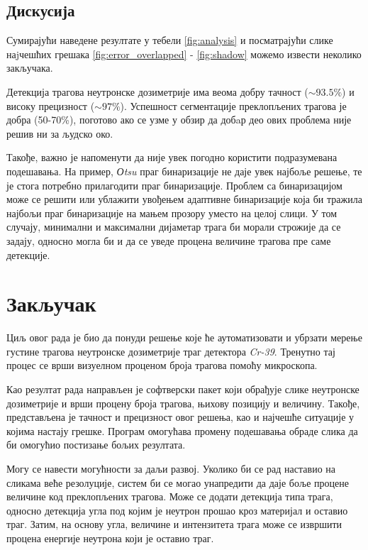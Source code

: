 \documentclass[11pt,a4paper,serbian,oneside]{book}
\begin{document}
\section{Дискусија}

Сумирајући наведене резултате у тебели \ref{fig:analysis} и посматрајући слике наjчешћих грешака  \ref{fig:error_overlapped} - \ref{fig:shadow} можемо извести неколико закључака.

Детекција трагова неутронске дозиметрије има веома добру тачност ($\sim93.5\%$) и  високу прецизност ($\sim97\%$). Успешност сегментације преклопљених трагова је добра (50-70\%), поготово ако се узме у обзир да добaр део ових проблема није решив ни за људско око.

Такође, важно је напоменути да није увек погодно користити подразумевана подешавања. На пример, \textit{Оtsu} праг бинаризације не даје увек најбоље решење, те је стога потребно прилагодити праг бинаризације. Проблем са бинаризацијом може се решити или ублажити увођењем адаптивне бинаризације која би тражила најбољи праг бинаризације на мањем прозору уместо на целој слици. У том случају, минимални и максимални дијаметар трага би морали строжије да се задају, односно могла би и да се уведе процена величине трагова пре саме детекције.

%
%
%

\chapter{Закључак}

Циљ овог рада је био да понуди решење које ће аутоматизовати и убрзати мерење густине трагова неутронске дозиметрије траг детектора \textit{Cr-39}. Тренутно тај процес се врши визуелном проценом броја трагова помоћу микроскопа.

Као резултат рада направљен је софтверски пакет који обрађује слике неутронске дозиметрије и врши процену броја трагова, њихову позицију и величину. Такође, представљена је тачност и прецизност овог решења, као и најчешће ситуације у којима настају грешке. Програм омогућава промену подешавања обраде слика да би омогућио постизање бољих резултата.

Могу се навести могућности за даљи развој. Уколико би се рад наставио на сликама веће резолуције, систем би се могао унапредити да даје боље процене величине код преклопљених трагова. Може се додати детекција типа трага, односно детекција угла под којим је неутрон прошао кроз материјал и оставио траг. Затим, на основу угла, величине и интензитета трага може се извршити процена енергије неутрона који је оставио траг.  
\end{document}
